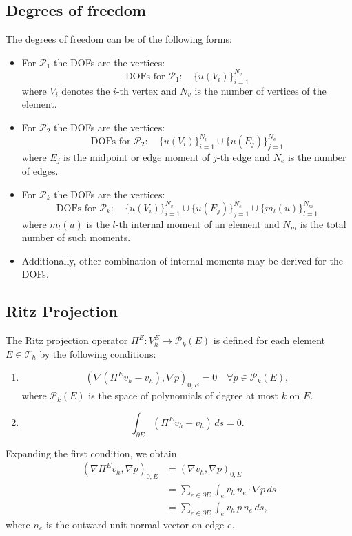 \documentclass[class=article, crop=false]{standalone}
\begin{document}
\subsection{Degrees of freedom}
The degrees of freedom can be of the following forms:
\begin{itemize}
    \item For $\mathcal{P}_1$ the DOFs are the vertices:
    $$\text{DOFs for } \mathcal{P}_1: \quad \{ u(V_i) \}_{i=1}^{N_v}$$
    where $V_i$ denotes the $i$-th vertex and $N_v$ is the number of vertices of the element.
    
    \item For $\mathcal{P}_2$ the DOFs are the vertices:
    $$\text{DOFs for } \mathcal{P}_2: \quad \{ u(V_i) \}_{i=1}^{N_v} \cup \{ u(E_j) \}_{j=1}^{N_e}$$
    where $E_j$ is the midpoint or edge moment of $j$-th edge and $N_e$ is the number of edges.
    
    \item For $\mathcal{P}_k$ the DOFs are the vertices:
    $$\text{DOFs for } \mathcal{P}_k: \quad \{ u(V_i) \}_{i=1}^{N_v} \cup \{ u(E_j) \}_{j=1}^{N_e} \cup \{ m_l(u) \}_{l=1}^{N_m}$$
    where $m_l(u)$ is the $l$-th internal moment of an element and $N_m$ is the total number of such moments.

    \item Additionally, other combination of internal moments may be derived for the DOFs.    
\end{itemize}



\subsection{Ritz Projection}
The Ritz projection operator $\Pi^E: V_h^E \rightarrow \mathcal{P}_k(E)$ is defined for each element $E \in \mathcal{T}_h$ by the following conditions:
\begin{enumerate}
    \item
    \[
    (\nabla (\Pi^E v_h - v_h), \nabla p)_{0,E} = 0 \quad \forall p \in \mathcal{P}_k(E),
    \]
    where $\mathcal{P}_k(E)$ is the space of polynomials of degree at most $k$ on $E$.
    
    \item
    \[
    \int_{\partial E} (\Pi^E v_h - v_h) \, ds = 0.
    \]
\end{enumerate}

Expanding the first condition, we obtain
\begin{align*}
(\nabla \Pi^E v_h, \nabla p)_{0,E} &= (\nabla v_h, \nabla p)_{0,E} \\
&= \sum_{e \in \partial E} \int_e v_h \, n_e \cdot \nabla p \, ds \\
&= \sum_{e \in \partial E} \int_e v_h \, p \, n_e \, ds,
\end{align*}
where $n_e$ is the outward unit normal vector on edge $e$.
\end{document}
